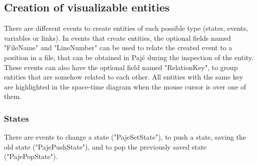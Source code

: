 \subsection{Creation of visualizable entities}
\label{sec:creation}

There are different events to create entities of each possible type
(states, events, variables or links).
In events that create entities, the optional fields named "FileName" and "LineNumber" can be used to relate the created event to a position in a file, that can be obtained in Pajé during the inspection of the entity.
These events can also have the optional field named "RelationKey", to group entities that are somehow related to each other. All entities with the same key are highlighted in the space-time diagram when the mouse cursor is over one of them.

\subsubsection{States}

There are events to change a state
("PajeSetState"), to push a state, saving the old
state ("PajePushState"), and to pop the
previously saved state ("PajePopState").

